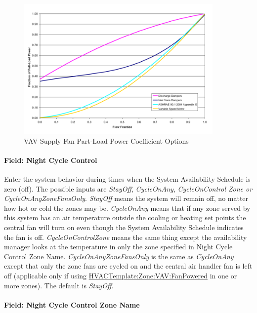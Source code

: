 \begin{figure}[hbtp] %
\centering
\includegraphics[width=0.9\textwidth, height=0.9\textheight, keepaspectratio=true]{media/image612.png}
\caption{VAV Supply Fan Part-Load Power Coefficient Options \protect \label{fig:vav-supply-fan-part-load-power-coefficient-001}}
\end{figure}

\paragraph{Field: Night Cycle Control}\label{field-night-cycle-control-3}

Enter the system behavior during times when the System Availability Schedule is zero (off). The possible inputs are \emph{StayOff}, \emph{CycleOnAny}, \emph{CycleOnControl Zone or CycleOnAnyZoneFansOnly}. \emph{StayOff} means the system will remain off, no matter how hot or cold the zones may be. \emph{CycleOnAny} means that if any zone served by this system has an air temperature outside the cooling or heating set points the central fan will turn on even though the System Availability Schedule indicates the fan is off. \emph{CycleOnControlZone} means the same thing except the availability manager looks at the temperature in only the zone specified in Night Cycle Control Zone Name. \emph{CycleOnAnyZoneFansOnly} is the same as \emph{CycleOnAny} except that only the zone fans are cycled on and the central air handler fan is left off (applicable only if using \hyperref[hvactemplatezonevavfanpowered]{HVACTemplate:Zone:VAV:FanPowered} in one or more zones). The default is \emph{StayOff}.

\paragraph{Field: Night Cycle Control Zone Name}\label{field-night-cycle-control-zone-name-3}

